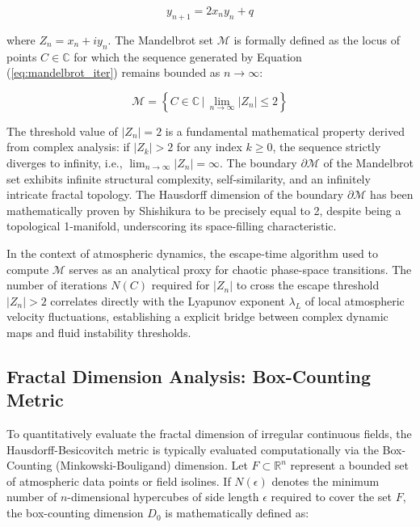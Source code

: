 \documentclass[11pt,a4paper]{article}
\begin{document}
\begin{equation}
y_{n+1} = 2x_n y_n + q
\label{eq:mandelbrot_imag}
\end{equation}

\noindent where $Z_n = x_n + i y_n$. The Mandelbrot set $\mathcal{M}$ is formally defined as the locus of points $C \in \mathbb{C}$ for which the sequence generated by Equation (\ref{eq:mandelbrot_iter}) remains bounded as $n \to \infty$:

\begin{equation}
\mathcal{M} = \left\{ C \in \mathbb{C} \, \Big| \, \lim_{n \to \infty} |Z_n| \le 2 \right\}
\label{eq:mandelbrot_set_def}
\end{equation}

The threshold value of $|Z_n| = 2$ is a fundamental mathematical property derived from complex analysis: if $|Z_k| > 2$ for any index $k \ge 0$, the sequence strictly diverges to infinity, i.e., $\lim_{n \to \infty} |Z_n| = \infty$. The boundary $\partial \mathcal{M}$ of the Mandelbrot set exhibits infinite structural complexity, self-similarity, and an infinitely intricate fractal topology. The Hausdorff dimension of the boundary $\partial \mathcal{M}$ has been mathematically proven by Shishikura to be precisely equal to 2, despite being a topological 1-manifold, underscoring its space-filling characteristic.

In the context of atmospheric dynamics, the escape-time algorithm used to compute $\mathcal{M}$ serves as an analytical proxy for chaotic phase-space transitions. The number of iterations $N(C)$ required for $|Z_n|$ to cross the escape threshold $|Z_n| > 2$ correlates directly with the Lyapunov exponent $\lambda_{L}$ of local atmospheric velocity fluctuations, establishing a explicit bridge between complex dynamic maps and fluid instability thresholds.

\subsection{Fractal Dimension Analysis: Box-Counting Metric}

To quantitatively evaluate the fractal dimension of irregular continuous fields, the Hausdorff-Besicovitch metric is typically evaluated computationally via the Box-Counting (Minkowski-Bouligand) dimension. Let $F \subset \mathbb{R}^n$ represent a bounded set of atmospheric data points or field isolines. If $N(\epsilon)$ denotes the minimum number of $n$-dimensional hypercubes of side length $\epsilon$ required to cover the set $F$, the box-counting dimension $D_0$ is mathematically defined as:
\end{document}
